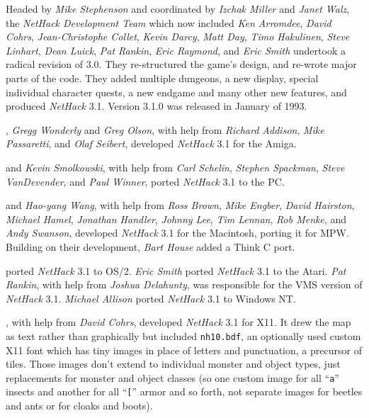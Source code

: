 \medskip
\nd Headed by {\it Mike Stephenson\/} and coordinated by {\it Izchak Miller\/}
and {\it Janet Walz}, the {\it NetHack Development Team} which now included
{\it Ken Arromdee},
{\it David Cohrs}, {\it Jean-Christophe Collet}, {\it Kevin Darcy},
{\it Matt Day}, {\it Timo Hakulinen}, {\it Steve Linhart}, {\it Dean Luick},
{\it Pat Rankin}, {\it Eric Raymond}, and {\it Eric Smith\/} undertook a
radical revision of 3.0.
They re-structured the game's design, and re-wrote major
parts of the code.
They added multiple dungeons, a new display, special
individual character quests, a new endgame and many other new features, and
produced {\it NetHack\/} 3.1.
Version 3.1.0 was released in January of 1993.

\medskip
{}, {\it Gregg Wonderly\/} and {\it Greg Olson}, with help
from {\it Richard Addison}, {\it Mike Passaretti}, and {\it Olaf Seibert},
developed {\it NetHack\/} 3.1 for the Amiga.

\medskip
{} and {\it Kevin Smolkowski}, with help from
{\it Carl Schelin}, {\it Stephen Spackman}, {\it Steve VanDevender},
and {\it Paul Winner}, ported {\it NetHack\/} 3.1 to the PC.

\medskip
{} and {\it Hao-yang Wang},
with help from {\it Ross Brown}, {\it Mike Engber}, {\it David Hairston},
{\it Michael Hamel}, {\it Jonathan Handler}, {\it Johnny Lee},
{\it Tim Lennan}, {\it Rob Menke}, and {\it Andy Swanson},
developed {\it NetHack\/} 3.1 for the Macintosh, porting it for MPW.
Building on their development, {\it Bart House} added a Think C port.

\medskip
{} ported {\it NetHack\/} 3.1 to OS/2.
{\it Eric Smith\/} ported {\it NetHack\/} 3.1 to the Atari.
{\it Pat Rankin}, with help from {\it Joshua Delahunty},
was responsible for the VMS version of {\it NetHack\/} 3.1.
{\it Michael Allison} ported {\it NetHack\/} 3.1 to Windows NT.

\medskip
{}, with help from {\it David Cohrs}, developed
{\it NetHack\/} 3.1 for X11.
It drew the map as text rather than graphically but
included {\tt nh10.bdf}, an optionally used custom X11 font which has
tiny images in place of letters and punctuation, a precursor of tiles.
Those images don't extend to individual monster and object types, just
replacements for monster and object classes (so one custom image for all
``{\tt a}'' insects and another for all ``{\tt [}'' armor and so
forth, not separate images for beetles and ants or for cloaks and boots).

